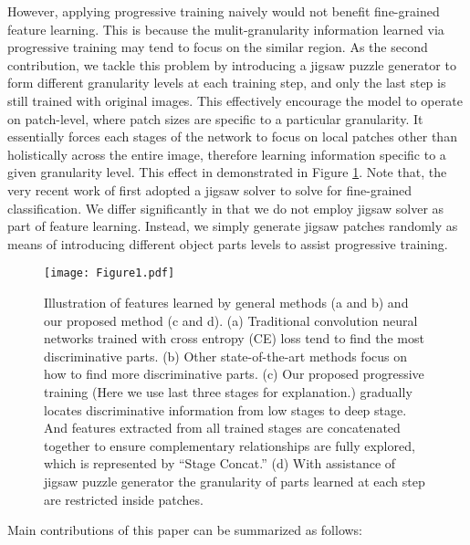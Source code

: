 \documentclass{llncs}
\begin{document}
However, applying progressive training naively would not benefit fine-grained feature learning. This is because the mulit-granularity information learned via progressive training may tend to focus on the similar region. As the second contribution, we tackle this problem by introducing a jigsaw puzzle generator to form different granularity levels at each training step, and only the last step is still trained with original images. This effectively encourage the model to operate on patch-level, where patch sizes are specific to a particular granularity. It essentially forces each stages of the network to focus on local patches other than holistically across the entire image, therefore learning information specific to a given granularity level. This effect in demonstrated in Figure \ref{fig:split_example}. Note that, the very recent work of \cite{chen2019destruction} first adopted a jigsaw solver to solve for fine-grained classification. We differ significantly in that we do not employ jigsaw solver as part of feature learning. Instead, we simply generate jigsaw patches randomly as means of introducing different object parts levels to assist progressive training. 









\begin{figure}[ht]
\centering
\texttt{[image: Figure1.pdf]}
  \caption{Illustration of features learned by general methods (a and b) and our proposed method (c and d). (a) Traditional convolution neural networks trained with cross entropy (CE) loss tend to find the most discriminative parts. (b) Other state-of-the-art methods focus on how to find more discriminative parts. (c) Our proposed progressive training (Here we use last three stages for explanation.) gradually locates discriminative information from low stages to deep stage. And features extracted from all trained stages are concatenated together to ensure complementary relationships are fully explored, which is represented by ``Stage Concat.'' (d) With assistance of jigsaw puzzle generator the granularity of parts learned at each step are restricted inside patches.}
  \label{fig:split_example}
\end{figure}

Main contributions of this paper can be summarized as follows:
\end{document}

